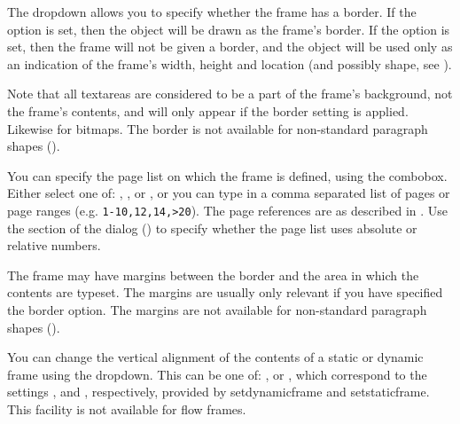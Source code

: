 
The  \gls*{dropdown} allows you
to specify whether the frame has a border. If the option
 is set, then the
\gls{object} will be drawn as the frame's border. If the option
 is set, then the frame will
not be given a border, and the object will be used only as an
indication of the frame's width, height and location (and
possibly shape, see ).

Note that all \glspl{textarea} are considered to be a part of the
frame's background, not the frame's contents, and will only appear if
the border  setting is
applied. Likewise for \glspl{bitmap}. The border is not available
for non-standard paragraph shapes ().


You can specify the page list on which the frame is defined, using the
 \gls*{combobox}. Either select one of:
,
,
 or
, or you can type in a comma
separated list of pages or page ranges (e.g. \verb|1-10,12,14,>20|).
The page references are as described in
. Use the
 section of the
 dialog () to
specify whether the page list uses absolute or relative numbers.


The frame may have margins between the border and the area in which
the contents are typeset. The margins are usually only relevant
if you have specified the 
border option. The margins are not available for non-standard
paragraph shapes ().


You can change the vertical alignment of the contents of a static or
dynamic frame using the  \gls{dropdown}.
This can be one of: ,
 or ,
which correspond to the settings ,
 and ,
respectively, provided by \gls{setdynamicframe} and
\gls{setstaticframe}. This facility is not available for flow
frames.

